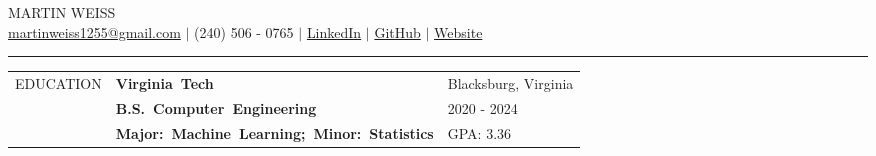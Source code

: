 \documentclass[12pt, letter]{book}
\begin{document}
\begin{center}
    {\Huge MARTIN WEISS} \\
    \href{mailto:martinweiss1255@gmail.com}{{martinweiss1255@gmail.com}} $|$ 
    (240) 506 - 0765 $|$ 
    \href{https://www.linkedin.com/in/martinweiss12}{LinkedIn} $|$
    \href{https://github.com/MartinWeiss12}{GitHub} $|$
    \href{https://martiniweiss.com}{Website}\\[-2mm]
    \rule{\textwidth}{0.4pt}
    
\end{center}


\noindent
\begin{tabular}{@{}>{\raggedright\arraybackslash}p{3.5cm}@{}p{5cm}@{}>{\raggedleft\arraybackslash}p{10.5cm}@{}}
    \footnotesize {EDUCATION} & \textbf{\footnotesize\mbox{Virginia Tech}} & {\footnotesize {Blacksburg, Virginia}} \\
    & \textbf{\footnotesize\mbox{B.S. Computer Engineering}} & {\footnotesize {2020 - 2024}} \\
    & \textbf{\footnotesize\mbox{Major: Machine Learning; Minor: Statistics}} & {\footnotesize {GPA: 3.36}} \\
\end{tabular}

\vspace{4mm}

\end{document}
